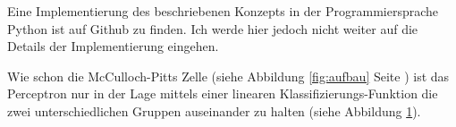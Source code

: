 
Eine Implementierung des beschriebenen Konzepts in der Programmiersprache Python ist auf Github \cite{pcImplementierung} zu finden. Ich werde hier jedoch nicht weiter auf die Details der Implementierung eingehen.

Wie schon die McCulloch-Pitts Zelle (siehe Abbildung \ref{fig:aufbau} Seite \pageref{fig:aufbau}) ist das Perceptron nur in der Lage mittels einer linearen Klassifizierungs-Funktion die zwei unterschiedlichen Gruppen auseinander zu halten (siehe Abbildung \ref{fig:probKlassi}).

\FloatBarrier

\begin{figure}[htb!]
  \centering
  \qquad
  \label{fig:probKlassi}
\end{figure}
